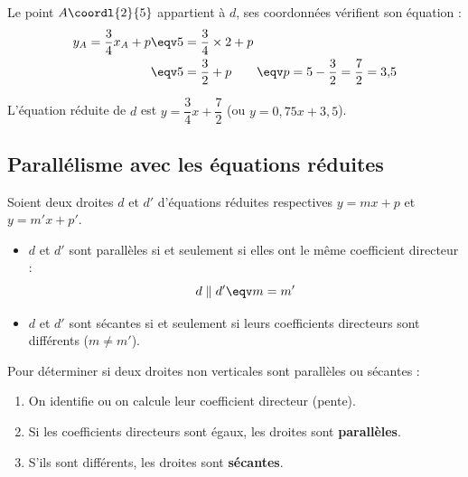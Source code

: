 \begin{meth}
\begin{correction}
\begin{enumerate}[resume]
			      Le point $A\coordl{2}{5}$ appartient à $d$, ses coordonnées vérifient son équation :
			      \begin{align*}
				      y_A = \frac{3}{4}x_A + p & \eqv 5 = \frac{3}{4} \times 2 + p                                              \\
				                               & \eqv 5 = \frac{3}{2} + p \qquad \eqv p = 5 - \frac{3}{2} = \frac{7}{2} = 3{,}5
			      \end{align*}
		\end{enumerate}

		L'équation réduite de $d$ est $y = \dfrac{3}{4}x + \dfrac{7}{2}$ (ou $y = 0{,}75x + 3{,}5$).
	\end{correction}
\end{meth}

\subsection{Parallélisme avec les équations réduites}

\begin{prop}
	Soient deux droites $d$ et $d'$ d'équations réduites respectives $y = mx + p$ et $y = m'x + p'$.
	\begin{itemize}
		\item $d$ et $d'$ sont parallèles si et seulement si elles ont le même coefficient directeur :
		      \[
			      d \parallel d' \eqv m = m'
		      \]
		\item $d$ et $d'$ sont sécantes si et seulement si leurs coefficients directeurs sont différents ($m \neq m'$).
	\end{itemize}
\end{prop}

\begin{methode}
	Pour déterminer si deux droites non verticales sont parallèles ou sécantes :
	\begin{enumerate}
		\item On identifie ou on calcule leur coefficient directeur (pente).
		\item Si les coefficients directeurs sont égaux, les droites sont \textbf{parallèles}.
		\item S'ils sont différents, les droites sont \textbf{sécantes}.
	\end{enumerate}
\end{methode}

